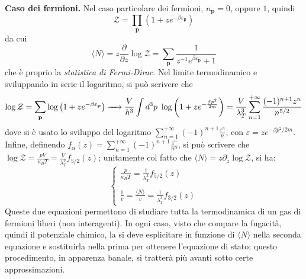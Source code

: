 \documentclass[11pt, a4paper]{scrartcl}
\theoremstyle{style}
\theoremstyle{style1}
\numberwithin{equation}{subsection}
\begin{document}
\textbf{Caso dei fermioni.} Nel caso particolare dei fermioni, $n_\mathbf{p} = 0$, oppure $1$, quindi
\[
\mathcal{Z}  = \prod_\mathbf{p} \left(1 + z e^{-\beta \varepsilon _\mathbf{p} }\right) 
\] 
da cui 
\[
\langle N \rangle = z \frac{\partial }{\partial z} \log\mathcal{Z} = \sum_{\mathbf{p} }^{} \frac{1}{z^{-1}e^{\beta \varepsilon _\mathbf{p} }+1}
\] 
che \`e proprio la \textit{statistica di Fermi-Dirac}.
Nel limite termodinamico e sviluppando in serie il logaritmo, si pu\`o scrivere che 
\[
	\log \mathcal{Z}  = \sum_{\mathbf{p}}^{} \log\left(1+ z e^{-\beta \varepsilon _\mathbf{p} }\right) \xrightarrow{\hspace{.4cm}} \frac{V}{h^3} \int d^3 p \ \log\left(1 + z e^{- \frac{\beta  p^2}{2m}}\right) = \frac{V}{\lambda _T^3} \sum_{n=1}^{+\infty} \frac{(-1)^{n+1}z^n}{n^{5 / 2}}
\] 
dove si \`e usato lo sviluppo del logaritmo $\sum_{n=1}^{+\infty} (-1)^{n+1} \frac{\varepsilon ^n}{n}$, con $ \varepsilon  = z e^{-\beta p^2 / 2m}$.
Infine, definendo $f_\alpha (z) = \sum_{n=1}^{+\infty} (-1)^{n+1}\frac{z^n}{n^\alpha }$, si pu\`o scrivere che $\log\mathcal{Z} = \frac{pV}{\kappa _BT}= \frac{V}{\lambda _T^3} f_{5 / 2} (z)$; unitamente col fatto che $\langle N \rangle = z \partial _z \log \mathcal{Z} $, si ha:
\begin{equation}\label{fni}
	\begin{cases}
		\displaystyle \frac{p}{\kappa _B T} = \frac{1}{\lambda _T^3} f_{5 / 2} (z)\\
		\\
		\displaystyle \frac{1}{v} = \frac{\langle N \rangle}{v}=\frac{1}{\lambda _T^3} f_{3/2} (z)
	\end{cases}
\end{equation}
Queste due equazioni permettono di studiare tutta la termodinamica di un gas di fermioni liberi (non interagenti). 
In ogni caso, visto che compare la fugacit\`a, quindi il potenziale chimico, la si deve esplicitare in funzione di $\langle N \rangle$ nella seconda equazione e sostituirla nella prima per ottenere l'equazione di stato; questo procedimento, in apparenza banale, si tratter\`a pi\`u avanti sotto certe approssimazioni.
\vspace{.5cm}
\end{document}
